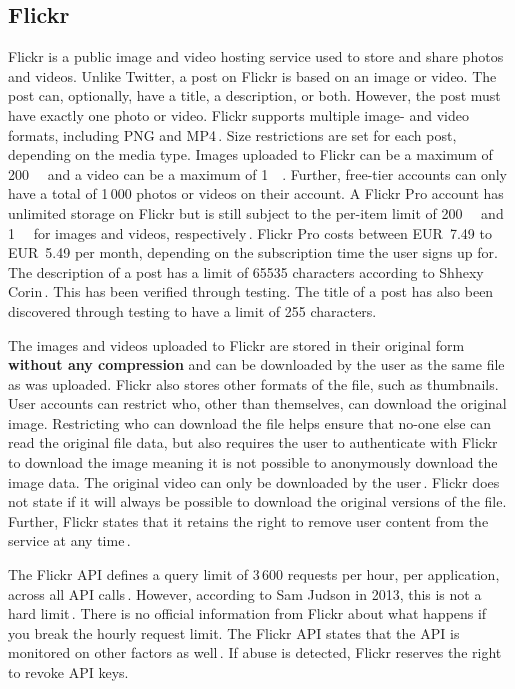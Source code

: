 \subsection{Flickr}
\label{subsec:ows_flickr}
Flickr is a public image and video hosting service used to store and share photos and videos. Unlike Twitter, a post on Flickr is based on an image or video. The post can, optionally, have a title, a description, or both. However, the post must have exactly one photo or video. Flickr supports multiple image- and video formats, including PNG and MP4\,\cite{FlickrUploadRequirements2022}. Size restrictions are set for each post, depending on the media type. Images uploaded to Flickr can be a maximum of \SI{200}{\mega\byte} and a video can be a maximum of \SI{1}{\giga\byte}. Further, \mbox{free-tier} accounts can only have a total of 1\,000 photos or videos on their account. A Flickr Pro account has unlimited storage on Flickr but is still subject to the \mbox{per-item} limit of \SI{200}{\mega\byte} and \SI{1}{\giga\byte} for images and videos, respectively\,\cite{flickrinc.UpgradeEverythingYou}. Flickr Pro costs between EUR~7.49 to EUR~5.49 per month, depending on the subscription time the user signs up for. The description of a post has a limit of 65535 characters according to Shhexy Corin\,\cite{FlickrHelpForum2009}. This has been verified through testing. The title of a post has also been discovered through testing to have a limit of 255 characters.

The images and videos uploaded to Flickr are stored in their original form \textbf{without any compression} and can be downloaded by the user as the same file as was uploaded\cite{flickrinc.DownloadPermissions}. Flickr also stores other formats of the file, such as thumbnails. User accounts can restrict who, other than themselves, can download the original image. Restricting who can download the file helps ensure that \mbox{no-one} else can read the original file data, but also requires the user to authenticate with Flickr to download the image meaning it is not possible to anonymously download the image data. The original video can only be downloaded by the user\,\cite{flickrinc.DownloadPermissions}. Flickr does not state if it will always be possible to download the original versions of the file. Further, Flickr states that it retains the right to remove user content from the service at any time\,\cite{flickrinc.FlickrTermsConditions2020}.

The Flickr \gls{API} defines a query limit of 3\,600 requests per hour, per application, across all \gls{API} calls\,\cite{flickrinc.FlickrFlickrDeveloper}. However, according to Sam Judson in 2013, this is not a hard limit\,\cite{WhatAreAPI2013}. There is no official information from Flickr about what happens if you break the hourly request limit. The Flickr \gls{API} states that the \gls{API} is monitored on other factors as well\,\cite{flickrinc.FlickrFlickrDeveloper}. If abuse is detected, Flickr reserves the right to revoke \gls{API} keys.